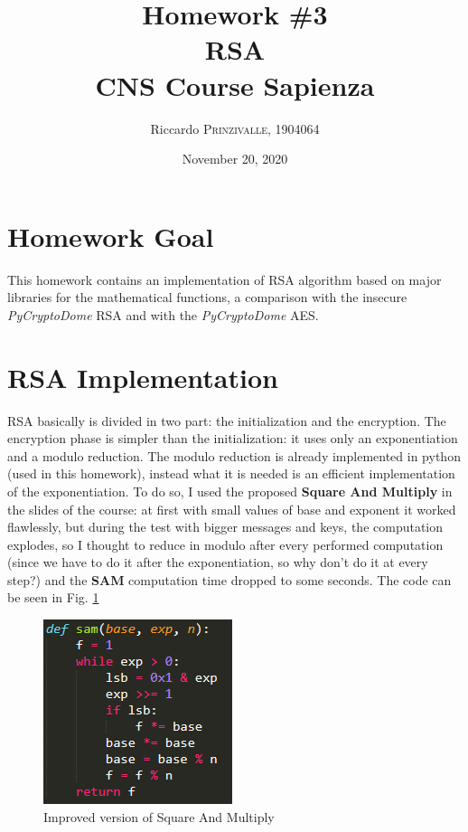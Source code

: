 \documentclass{article}
\title{Homework \#3 \\RSA \\[0.2em]\small{}CNS Course Sapienza} %
\author{Riccardo \textsc{Prinzivalle}, 1904064} %
\date{November 20, 2020} %
\begin{document}
\maketitle %


\section{Homework Goal}

This homework contains an implementation of RSA algorithm based on major libraries for the mathematical functions, a comparison with the insecure \textit{PyCryptoDome} RSA and with the \textit{PyCryptoDome} AES.


\section{RSA Implementation}

RSA basically is divided in two part: the initialization and the encryption.\newline 
The encryption phase is simpler than the initialization: it uses only an exponentiation and a modulo reduction. The modulo reduction is already implemented in python (used in this homework), instead what it is needed is an efficient implementation of the exponentiation. To do so, I used the proposed \textbf{Square And Multiply} in the slides of the course: at first with small values of base and exponent it worked flawlessly, but during the test with bigger messages and keys, the computation explodes, so I thought to reduce in modulo after every performed computation (since we have to do it after the exponentiation, so why don't do it at every step?) and the \textbf{SAM} computation time dropped to some seconds. The code can be seen in Fig. \ref{fig:sam}

\begin{figure}[H]
	\centering
	\includegraphics[width=0.345\linewidth]{images/SAM.png}
	\caption{Improved version of Square And Multiply}
	\label{fig:sam}
\end{figure}
\end{document}

